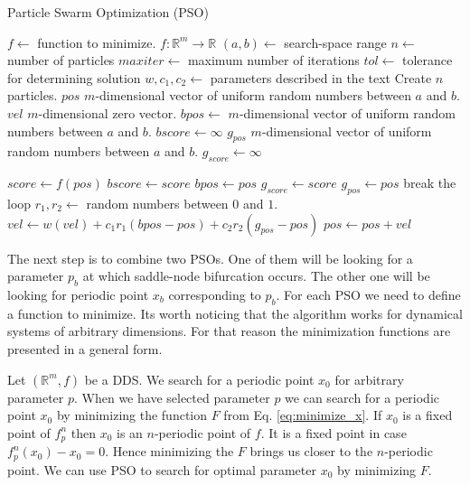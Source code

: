 \begin{algorithm}[!h]
    \caption{Particle Swarm Optimization (PSO)}
    \label{alg:pso}
    \begin{algorithmic}[1]
        \Statex $f \gets$ function to minimize. $f: \mathbb{R}^{m} \rightarrow \mathbb{R}$  
        \Statex $(a, b) \gets$ search-space range
        \Statex $n \gets$ number of particles
        \Statex $maxiter \gets$ maximum number of iterations
        \Statex $tol \gets$ tolerance for determining solution
        \Statex $w, c_{1}, c_{2} \gets$ parameters described in the text
        \State Create $n$ particles.
            \State $pos$ $m$-dimensional vector of uniform random numbers between $a$ and $b$.
            \State $vel$ $m$-dimensional zero vector.
            \State $bpos \gets$ $m$-dimensional vector of uniform random numbers between $a$ and $b$.
            \State $bscore \gets \infty$
        \EndFor
        \State $g_{pos}$ $m$-dimensional vector of uniform random numbers between $a$ and $b$.
        \State $g_{score} \gets \infty$

                \State $score \gets f(pos)$ 
                    \State $bscore \gets score$
                    \State $bpos \gets pos$
                \EndIf
                    \State $g_{score} \gets score$
                    \State $g_{pos} \gets pos$
                \EndIf
            \EndFor
                \State break the loop
            \EndIf
                \State $r_{1}, r_{2} \gets$ random numbers between $0$ and $1$.
                \State $vel \gets w(vel) + c_{1}r_{1}(bpos-pos) + c_{2}r_{2}(g_{pos}-pos)$
                \State $pos \gets pos + vel$
            \EndFor
        \EndFor
    \end{algorithmic}
\end{algorithm}

\par
The next step is to combine two PSOs.
One of them will be looking for a parameter $p_b$ at which saddle-node bifurcation occurs.
The other one will be looking for periodic point $x_b$ corresponding to $p_b$.
For each PSO we need to define a function to minimize.
Its worth noticing that the algorithm works for dynamical systems of arbitrary dimensions.
For that reason the minimization functions are presented in a general form.
\par
Let $(\mathbb{R}^{m}, f)$ be a DDS.
We search for a periodic point $x_0$ for arbitrary parameter $p$.
When we have selected parameter $p$ we can search for a periodic point $x_0$ by minimizing the function $F$ from Eq. \ref{eq:minimize_x}.
If $x_0$ is a fixed point of $f^{n}_{p}$ then $x_0$ is an $n$-periodic point of $f$.
It is a fixed point in case $f^{n}_{p}(x_0)-x_0 = 0$.
Hence minimizing the $F$ brings us closer to the $n$-periodic point.
We can use PSO to search for optimal parameter $x_0$ by minimizing $F$.

